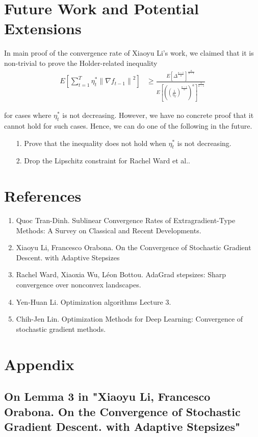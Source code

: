 \documentclass[14pt,onecolumn,letterpaper]{extarticle}
\begin{document}
\section{Future Work and Potential Extensions}
In main proof of the convergence rate of Xiaoyu Li's work, we claimed that it is non-trivial to prove the Holder-related inequality 
\begin{align*} E\left[\sum_{t=1}^T \eta_t^*\left\|\nabla f_{t-1}\right\|^2\right] & \geq \frac{E\left[\Delta^{\frac{a-1}{a}}\right]^{\frac{a}{a-1}}}{E\left[\left(\left(\frac{1}{\eta_T}\right)^{\frac{a-1}{a}}\right)^{a}\right]^{\frac{1}{a-1}}}\end{align*} 

for cases where $\eta_t^*$ is not decreasing. However, we have no concrete proof that it cannot hold for such cases. Hence, we can do one of the following in the future.
\begin{enumerate}
        \item [1.] Prove that the inequality does not hold when $\eta_t^*$ is not decreasing.
        \item [2.] Drop the Lipschitz constraint for Rachel Ward et al..
        
\end{enumerate}

\section{References}
\begin{enumerate}
    \item Quoc Tran-Dinh. Sublinear Convergence Rates of Extragradient-Type Methods: A
Survey on Classical and Recent Developments. 
    \item Xiaoyu Li, Francesco Orabona. On the Convergence of Stochastic Gradient Descent.
with Adaptive Stepsizes
    \item Rachel Ward, Xiaoxia Wu, Léon Bottou. AdaGrad stepsizes: Sharp convergence over nonconvex
landscapes.
    \item Yen-Huan Li. Optimization algorithms Lecture 3.
    \item Chih-Jen Lin. Optimization Methods for Deep Learning: Convergence of stochastic gradient methods.
\end{enumerate}
\section{Appendix}
\subsection{On Lemma 3 in "Xiaoyu Li, Francesco Orabona. On the Convergence of Stochastic Gradient Descent. with Adaptive Stepsizes"}
\end{document}
